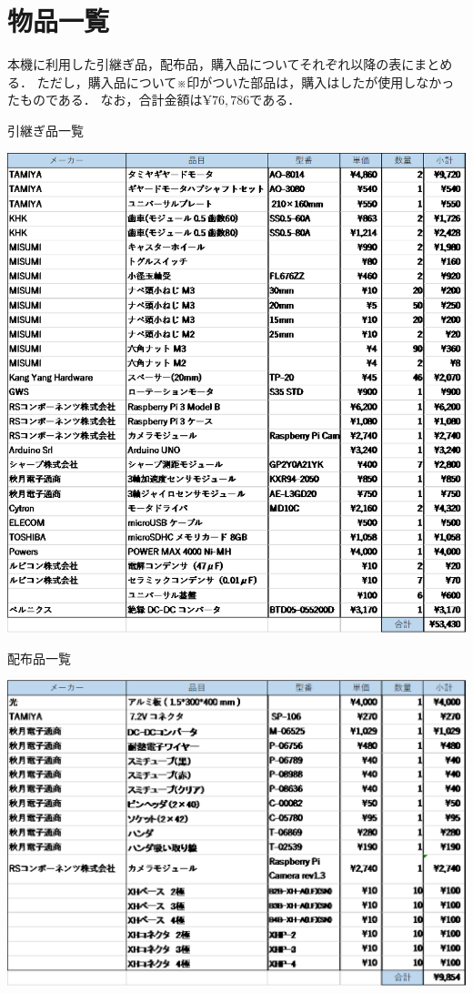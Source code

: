 \documentclass[11pt,a4]{jsarticle}
\begin{document}
\newpage
\section{物品一覧}

  本機に利用した引継ぎ品，配布品，購入品についてそれぞれ以降の表にまとめる．
  ただし，購入品について※印がついた部品は，購入はしたが使用しなかったものである．
  なお，合計金額は$\yen 76,786$である．

  \begin{table}[H]
    \centering
    \caption{引継ぎ品一覧}
    \includegraphics[width=1.0\hsize]{picture/items_inherited.eps}
  \end{table}

  \begin{table}[H]
    \centering
    \caption{配布品一覧}
    \includegraphics[width=1.0\hsize]{picture/items_distributed.eps}
  \end{table}
\end{document}
